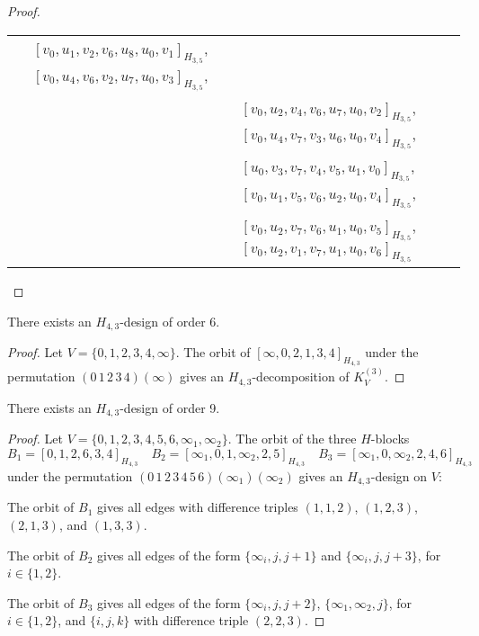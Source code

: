 \begin{subappendices}
\begin{proof}
{\begin{longtable}{|c|l|}
  $[v_0, u_1, v_2, v_6, u_8, u_0, v_1]_{H_{3,5}}$,
  $[v_0, u_4, v_6, v_2, u_7, u_0, v_3]_{H_{3,5}}$, \\* &
  $[v_0, u_2, v_4, v_6, u_7, u_0, v_2]_{H_{3,5}}$,
  $[v_0, u_4, v_7, v_3, u_6, u_0, v_4]_{H_{3,5}}$, \\* &
  $[u_0, v_3, v_7, v_4, v_5, u_1, v_0]_{H_{3,5}}$,
  $[v_0, u_1, v_5, v_6, u_2, u_0, v_4]_{H_{3,5}}$, \\* &
  $[v_0, u_2, v_7, v_6, u_1, u_0, v_5]_{H_{3,5}}$,
  $[v_0, u_2, v_1, v_7, u_1, u_0, v_6]_{H_{3,5}}$
\\ \hline
\end{longtable}
}
\end{proof}


\begin{example} \label{eg:H_43-6}
There exists an $H_{4,3}$-design of order 6.
\end{example}

\begin{proof}
Let $V = \{0,1,2,3,4,\infty\}$. The orbit of $[\infty, 0, 2, 1, 3, 4]_{H_{4,3}}$ under the permutation $(0\, 1\, 2\, 3\, 4)(\infty)$ gives an $H_{4,3}$-decomposition of $K_V^{(3)}$.
\end{proof}


\begin{example} \label{eg:H_43-9}
There exists an $H_{4,3}$-design of order 9.
\end{example}

\begin{proof}
Let $V = \{0,1,2,3,4,5,6,\infty_1,\infty_2\}$. The orbit of the three $H$-blocks
\[
    B_1 = [0,1,2,6,3,4]_{H_{4,3}} \quad
    B_2 = [\infty_1, 0, 1, \infty_2, 2, 5]_{H_{4,3}} \quad
    B_3 = [\infty_1, 0, \infty_2, 2, 4, 6]_{H_{4,3}}
\]
under the permutation $(0\, 1\, 2\, 3\, 4\, 5\, 6)(\infty_1)(\infty_2)$ gives an $H_{4,3}$-design on $V$:

The orbit of $B_1$ gives all edges with difference triples $(1, 1, 2)$, $(1, 2, 3)$, $(2, 1, 3)$, and $(1, 3, 3)$.

The orbit of $B_2$ gives all edges of the form $\{\infty_i, j, j+1\}$ and $\{\infty_i, j, j+3\}$, for $i \in \{1, 2\}$.

The orbit of $B_3$ gives all edges of the form $\{\infty_i, j, j+2\}$, $\{\infty_1, \infty_2, j\}$, for $i \in \{1, 2\}$, and $\{i, j, k\}$ with difference triple $(2, 2, 3)$.
\end{proof}


\end{subappendices}
